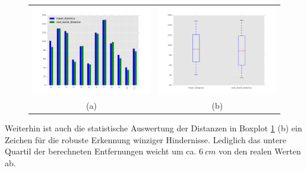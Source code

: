 	\begin{figure}[h]
		\centering
		\begin{tabular}{cc}
		\includegraphics[width=7cm]{img/evaluation/sample_tiny_bar}&
		\includegraphics[width=7cm]{img/evaluation/sample_tiny_box}\\
		 (a) & (b)
		\end{tabular}
		\caption{}
	    \label{fig:sample_eval_tiny}
	\end{figure}
	
	\noindent
	Weiterhin ist auch die statistische Auswertung der Distanzen in Boxplot \ref{fig:sample_eval_tiny} (b) ein Zeichen für die robuste Erkennung winziger Hindernisse. Lediglich das untere Quartil der berechneten Entfernungen weicht um ca. $6\ cm$ von den realen Werten ab.
	

